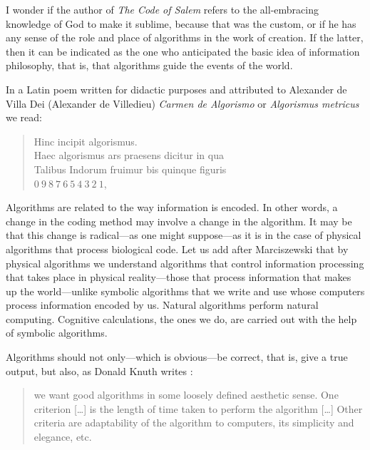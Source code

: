 \documentclass[pdftex,12pt]{article}
\begin{document}
I wonder if the author of \emph{The Code of Salem} refers to the all-embracing knowledge of God to make it sublime, because that was the custom, or if he has any sense of the role and place of algorithms in the work of creation. If the latter, then it can be indicated as the one who anticipated the basic idea of information philosophy, that is, that algorithms guide the events of the world.


In a Latin poem written for didactic purposes and attributed to Alexander de Villa Dei (Alexander de Villedieu) \emph{Carmen de Algorismo} or \emph{Algorismus metricus} \parencite*[printed edition][p.73]{alexander-villedieu_carmen_1839}
we read: {\small \begin{verse}
Hinc incipit algorismus. \\
Haec algorismus ars praesens dicitur in qua \\
Talibus Indorum fruimur bis quinque figuris \\
$ 0 \ 9 \ 8 \ 7 \ 6 \ 5 \ 4 \ 3 \ 2 \ 1 $, \\

\smallskip
\end{verse}}

Algorithms are related to the way information is encoded. In other words, a change in the coding method may involve a change in the algorithm. It may be that this change is radical---as one might suppose---as it is in the case of physical algorithms that process biological code. Let us add after Marciszewski \parencite*[p.199--200]{MarciszewskiStacewicz2011} that by physical algorithms we understand algorithms that control information processing that takes place in physical reality---those that process information that makes up the world---unlike symbolic algorithms that we write and use whose computers process information encoded by us. Natural algorithms perform natural computing. Cognitive calculations, the ones we do, are carried out with the help of symbolic algorithms.


Algorithms should not only---which is obvious---be correct, that is, give a true output, but also, as Donald Knuth writes \parencite*[p.7]{Knuth1997}: \begin{quote} \small we want good algorithms in some loosely defined aesthetic sense. One criterion [\dots] is the length of time taken to perform the algorithm [\dots] Other criteria are adaptability of the algorithm to computers, its simplicity and elegance, etc. \end{quote}
\end{document}
